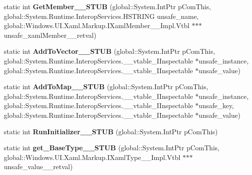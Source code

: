 \begin{DoxyCompactItemize}
static int {\bfseries Get\+Member\+\_\+\+\_\+\+S\+T\+UB} (global\+::\+System.\+Int\+Ptr p\+Com\+This, global\+::\+System.\+Runtime.\+Interop\+Services.\+H\+S\+T\+R\+I\+NG unsafe\+\_\+name, global\+::\+Windows.\+U\+I.\+Xaml.\+Markup.\+I\+Xaml\+Member\+\_\+\+\_\+\+Impl.\+Vtbl $\ast$$\ast$$\ast$unsafe\+\_\+xaml\+Member\+\_\+\+\_\+retval)
\item 
\mbox{\label{struct_windows_1_1_u_i_1_1_xaml_1_1_markup_1_1_i_xaml_type_____impl_1_1_vtbl_a94986475172034a779e4370b06a2bb95}} 
static int {\bfseries Add\+To\+Vector\+\_\+\+\_\+\+S\+T\+UB} (global\+::\+System.\+Int\+Ptr p\+Com\+This, global\+::\+System.\+Runtime.\+Interop\+Services.\+\_\+\+\_\+vtable\+\_\+\+I\+Inspectable $\ast$unsafe\+\_\+instance, global\+::\+System.\+Runtime.\+Interop\+Services.\+\_\+\+\_\+vtable\+\_\+\+I\+Inspectable $\ast$unsafe\+\_\+value)
\item 
\mbox{\label{struct_windows_1_1_u_i_1_1_xaml_1_1_markup_1_1_i_xaml_type_____impl_1_1_vtbl_a826597123ea75e675685fcdc220b845d}} 
static int {\bfseries Add\+To\+Map\+\_\+\+\_\+\+S\+T\+UB} (global\+::\+System.\+Int\+Ptr p\+Com\+This, global\+::\+System.\+Runtime.\+Interop\+Services.\+\_\+\+\_\+vtable\+\_\+\+I\+Inspectable $\ast$unsafe\+\_\+instance, global\+::\+System.\+Runtime.\+Interop\+Services.\+\_\+\+\_\+vtable\+\_\+\+I\+Inspectable $\ast$unsafe\+\_\+key, global\+::\+System.\+Runtime.\+Interop\+Services.\+\_\+\+\_\+vtable\+\_\+\+I\+Inspectable $\ast$unsafe\+\_\+value)
\item 
\mbox{\label{struct_windows_1_1_u_i_1_1_xaml_1_1_markup_1_1_i_xaml_type_____impl_1_1_vtbl_ad5c8dc426912e9b86124c65fc89447ce}} 
static int {\bfseries Run\+Initializer\+\_\+\+\_\+\+S\+T\+UB} (global\+::\+System.\+Int\+Ptr p\+Com\+This)
\item 
\mbox{\label{struct_windows_1_1_u_i_1_1_xaml_1_1_markup_1_1_i_xaml_type_____impl_1_1_vtbl_a3eabbdc6edd7e60a98ca2e1f1da8965c}} 
static int {\bfseries get\+\_\+\+Base\+Type\+\_\+\+\_\+\+S\+T\+UB} (global\+::\+System.\+Int\+Ptr p\+Com\+This, global\+::\+Windows.\+U\+I.\+Xaml.\+Markup.\+I\+Xaml\+Type\+\_\+\+\_\+\+Impl.\+Vtbl $\ast$$\ast$$\ast$unsafe\+\_\+value\+\_\+\+\_\+retval)

\end{DoxyCompactItemize}
